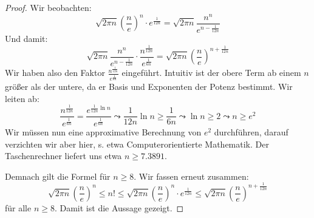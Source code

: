 \documentclass[10pt,fleqn]{article}
\theoremstyle{definition}
\theoremstyle{remark}
\begin{document}
\begin{proof}
    Wir beobachten:
    \[
        \sqrt{2 \pi n} \left(\frac{n}{e}\right)^n \cdot e^{\frac{1}{12n}} = \sqrt{2 \pi n} \frac{n^n}{e^{n-\frac{1}{12n}}}
    \]
    Und damit:
    \[
        \sqrt{2 \pi n} \frac{n^n}{e^{n-\frac{1}{12n}}} \cdot \frac{n^{\frac{1}{12n}}}{e^{\frac{1}{6n}}} = \sqrt{2 \pi n} \left(\frac{n}{e}\right)^{n+\frac{1}{12n}}
    \]
    Wir haben also den Faktor \(\frac{n^{\frac{1}{12n}}}{e^{\frac{1}{6n}}}\) eingeführt. Intuitiv ist der obere Term ab einem \(n\) größer als der untere, da er Basis und Exponenten der Potenz bestimmt. Wir leiten ab:
    \[
        \frac{n^{\frac{1}{12n}}}{e^{\frac{1}{6n}}} = \frac{e^{\frac{1}{12n}\ln{n}}}{e^{\frac{1}{6n}}} \leadsto \frac{1}{12n}\ln{n} \geq \frac{1}{6n} \leadsto \ln{n} \geq 2 \leadsto n \geq e^2
    \]
    Wir müssen nun eine approximative Berechnung von \(e^2\) durchführen, darauf verzichten wir aber hier, s. etwa Computerorientierte Mathematik. Der Taschenrechner liefert uns etwa \(n \geq 7.3891\).

    Demnach gilt die Formel für \(n \geq 8\). Wir fassen erneut zusammen:
    \[
        \sqrt{2 \pi n} \left(\frac{n}{e}\right)^n \leq n! \leq \sqrt{2 \pi n}\left(\frac{n}{e}\right)^n \cdot e^{\frac{1}{12n}} \leq \sqrt{2 \pi n} \left(\frac{n}{e}\right)^{n+\frac{1}{12n}}
    \]
    für alle \(n \geq 8\). Damit ist die Aussage gezeigt.
\end{proof}
\end{document}
